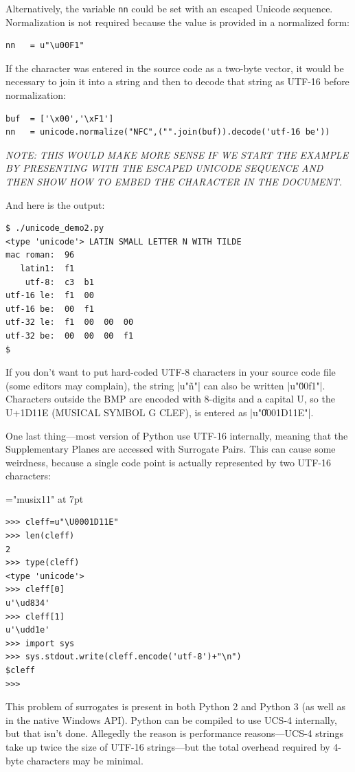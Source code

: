 Alternatively, the variable \texttt{nn} could be set with an escaped
Unicode sequence. Normalization is not required because the value is
provided in a normalized form:

\begin{Verbatim}
nn   = u"\u00F1"
\end{Verbatim}

If the character was entered in the source code as a two-byte vector,
it would be necessary to join it into a string and then to decode that
string as UTF-16 before normalization:

\begin{Verbatim}
buf  = ['\x00','\xF1']
nn   = unicode.normalize("NFC",("".join(buf)).decode('utf-16 be'))
\end{Verbatim}

\emph{NOTE: THIS WOULD MAKE MORE SENSE IF WE START THE EXAMPLE BY
  PRESENTING WITH THE ESCAPED UNICODE SEQUENCE AND THEN SHOW HOW TO
  EMBED THE CHARACTER IN THE DOCUMENT.}


And here is the output:

\begin{Verbatim}
$ ./unicode_demo2.py 
<type 'unicode'> LATIN SMALL LETTER N WITH TILDE
mac roman:  96 
   latin1:  f1 
    utf-8:  c3  b1 
utf-16 le:  f1  00 
utf-16 be:  00  f1 
utf-32 le:  f1  00  00  00 
utf-32 be:  00  00  00  f1 
$ 
\end{Verbatim}

If you don't want to put hard-coded UTF-8 characters in your source code file (some editors may complain), the string |u"ñ"| can also be written |u"\u00f1"|. Characters outside the BMP are encoded with 8-digits and a capital U, so the U+1D11E (MUSICAL SYMBOL G CLEF), is entered as |u"\U0001D11E"|.

One last thing---most version of Python use UTF-16 internally, meaning that the Supplementary Planes are accessed with Surrogate Pairs. This can cause some weirdness, because a single code point is actually represented by two UTF-16 characters:

\font\musixfont="musix11" at 7pt
\newcommand\cleff{{\musixfont G}} %
\begin{Verbatim}[commandchars=\$\{\}]
>>> cleff=u"\U0001D11E"
>>> len(cleff)
2
>>> type(cleff)
<type 'unicode'>
>>> cleff[0]
u'\ud834'
>>> cleff[1]
u'\udd1e'
>>> import sys
>>> sys.stdout.write(cleff.encode('utf-8')+"\n")
$cleff
>>> 
\end{Verbatim}
This problem of surrogates is present in both Python 2 and Python 3
(as well as in the native Windows API). Python can be compiled to use UCS-4
internally, but that isn't done. Allegedly the reason is performance
reasons---UCS-4 strings take up twice the size of UTF-16 strings---but
the total overhead required by 4-byte characters may be minimal. 


